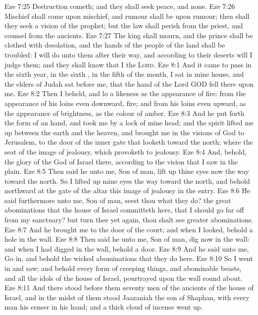 \vs Eze 7:25 Destruction cometh; and they shall seek peace, and  none.
\vs Eze 7:26 Mischief shall come upon mischief, and rumour shall be upon rumour; then shall they seek a vision of the prophet; but the law shall perish from the priest, and counsel from the ancients.
\vs Eze 7:27 The king shall mourn, and the prince shall be clothed with desolation, and the hands of the people of the land shall be troubled: I will do unto them after their way, and according to their deserts will I judge them; and they shall know that I  the \textsc{Lord}.
\vs Eze 8:1 And it came to pass in the sixth year, in the sixth , in the fifth  of the month,  I sat in mine house, and the elders of Judah sat before me, that the hand of the Lord GOD fell there upon me.
\vs Eze 8:2 Then I beheld, and lo a likeness as the appearance of fire: from the appearance of his loins even downward, fire; and from his loins even upward, as the appearance of brightness, as the colour of amber.
\vs Eze 8:3 And he put forth the form of an hand, and took me by a lock of mine head; and the spirit lifted me up between the earth and the heaven, and brought me in the visions of God to Jerusalem, to the door of the inner gate that looketh toward the north; where  the seat of the image of jealousy, which provoketh to jealousy.
\vs Eze 8:4 And, behold, the glory of the God of Israel  there, according to the vision that I saw in the plain.
\vs Eze 8:5 Then said he unto me, Son of man, lift up thine eyes now the way toward the north. So I lifted up mine eyes the way toward the north, and behold northward at the gate of the altar this image of jealousy in the entry.
\vs Eze 8:6 He said furthermore unto me, Son of man, seest thou what they do?  the great abominations that the house of Israel committeth here, that I should go far off from my sanctuary? but turn thee yet again,  thou shalt see greater abominations.
\vs Eze 8:7 And he brought me to the door of the court; and when I looked, behold a hole in the wall.
\vs Eze 8:8 Then said he unto me, Son of man, dig now in the wall: and when I had digged in the wall, behold a door.
\vs Eze 8:9 And he said unto me, Go in, and behold the wicked abominations that they do here.
\vs Eze 8:10 So I went in and saw; and behold every form of creeping things, and abominable beasts, and all the idols of the house of Israel, pourtrayed upon the wall round about.
\vs Eze 8:11 And there stood before them seventy men of the ancients of the house of Israel, and in the midst of them stood Jaazaniah the son of Shaphan, with every man his censer in his hand; and a thick cloud of incense went up.
